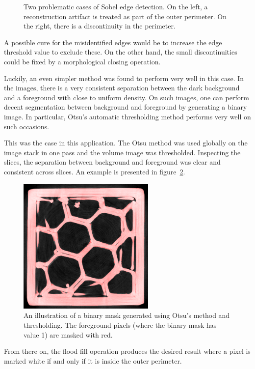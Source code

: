 \documentclass[a4paper,twoside,12pt]{article}
\begin{document}
\begin{figure}
\begin{subfigure}{0.5\textwidth}
    \end{subfigure}
    \caption{Two problematic cases of Sobel edge detection. On the left, a reconstruction artifact is treated as part of the outer perimeter. On the right, there is a discontinuity in the perimeter.}
    \label{fig:failed_sobel}
\end{figure}
A possible cure for the misidentified edges would be to increase the edge threshold value to exclude these. On the other hand, the small discontinuities could be fixed by a morphological closing operation.

Luckily, an even simpler method was found to perform very well in this case. In the images, there is a very consistent separation between the dark background and a foreground with close to uniform density. On such images, one can perform decent segmentation between background and foreground by generating a binary image. In particular, Otsu's automatic thresholding method performs very well on such occasions.

This was the case in this application. The Otsu method was used globally on the image stack in one pass and the volume image was thresholded. Inspecting the slices, the separation between background and foreground was clear and consistent across slices. An example is presented in figure~\ref{fig:otsu}.
\begin{figure}
    \centering
    \includegraphics[width=0.6\textwidth]{images/binary_initial_24.png}
    \caption{An illustration of a binary mask generated using Otsu's method and thresholding. The foreground pixels (where the binary mask has value 1) are masked with red.}
    \label{fig:otsu}
\end{figure}
From there on, the flood fill operation produces the desired result where a pixel is marked white if and only if it is inside the outer perimeter.
\end{document}
